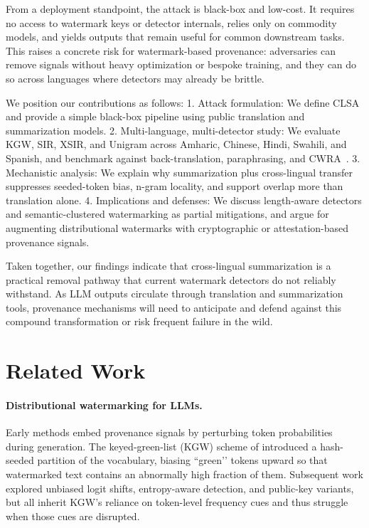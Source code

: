 \documentclass{article}
\begin{document}
From a deployment standpoint, the attack is black-box and low-cost. It requires no access to watermark keys or detector internals, relies only on commodity models, and yields outputs that remain useful for common downstream tasks. This raises a concrete risk for watermark-based provenance: adversaries can remove signals without heavy optimization or bespoke training, and they can do so across languages where detectors may already be brittle.

We position our contributions as follows:
	1.	Attack formulation: We define CLSA and provide a simple black-box pipeline using public translation and summarization models.
	2.	Multi-language, multi-detector study: We evaluate KGW, SIR, XSIR, and Unigram across Amharic, Chinese, Hindi, Swahili, and Spanish, and benchmark against back-translation, paraphrasing, and CWRA~\citep{He2024cwra}.
	3.	Mechanistic analysis: We explain why summarization plus cross-lingual transfer suppresses seeded-token bias, n-gram locality, and support overlap more than translation alone.
	4.	Implications and defenses: We discuss length-aware detectors and semantic-clustered watermarking as partial mitigations, and argue for augmenting distributional watermarks with cryptographic or attestation-based provenance signals.

Taken together, our findings indicate that cross-lingual summarization is a practical removal pathway that current watermark detectors do not reliably withstand. As LLM outputs circulate through translation and summarization tools, provenance mechanisms will need to anticipate and defend against this compound transformation or risk frequent failure in the wild.

\section{Related Work}

\paragraph{Distributional watermarking for LLMs.}
Early methods embed provenance signals by perturbing token probabilities during generation.
The keyed‐green-list (KGW) scheme of \citet{kirchenbauer2023watermark} introduced a hash-seeded partition of the vocabulary, biasing “green’’ tokens upward so that watermarked text contains an abnormally high fraction of them.
Subsequent work explored unbiased logit shifts, entropy-aware detection, and public-key variants, but all inherit KGW’s reliance on token-level frequency cues and thus struggle when those cues are disrupted.
\end{document}
